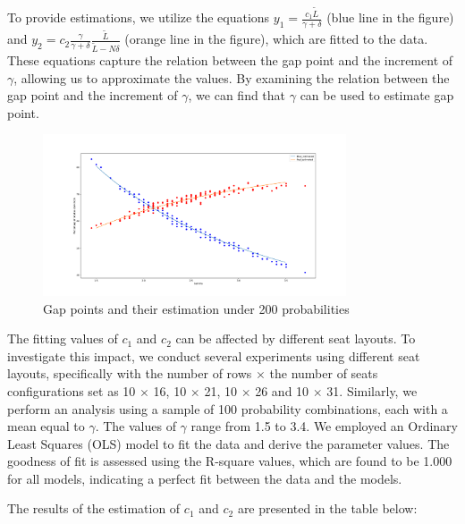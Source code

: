 To provide estimations, we utilize the equations $y_1 = \frac{c_1 \tilde{L}}{\gamma + \delta}$ (blue line in the figure) and $y_2 = c_2 \frac{\gamma}{\gamma + \delta} \frac{\tilde{L}}{\tilde{L}-N \delta}$ (orange line in the figure), which are fitted to the data. These equations capture the relation between the gap point and the increment of $\gamma$, allowing us to approximate the values. By examining the relation between the gap point and the increment of $\gamma$, we can find that $\gamma$ can be used to estimate gap point.

\begin{figure}[ht]
  \centering
    \includegraphics[width=0.8\textwidth]{./Figures/re2.pdf}
  \caption{Gap points and their estimation under 200 probabilities}
\end{figure}

The fitting values of $c_1$ and $c_2$ can be affected by different seat layouts. To investigate this impact, we conduct several experiments using different seat layouts, specifically with the number of rows $\times$ the number of seats configurations set as 10 $\times$ 16, 10 $\times$ 21, 10 $\times$ 26 and 10 $\times$ 31. Similarly, we perform an analysis using a sample of 100 probability combinations, each with a mean equal to $\gamma$. The values of $\gamma$ range from 1.5 to 3.4. We employed an Ordinary Least Squares (OLS) model to fit the data and derive the parameter values. The goodness of fit is assessed using the R-square values, which are found to be 1.000 for all models, indicating a perfect fit between the data and the models.

The results of the estimation of $c_1$ and $c_2$ are presented in the table below:

